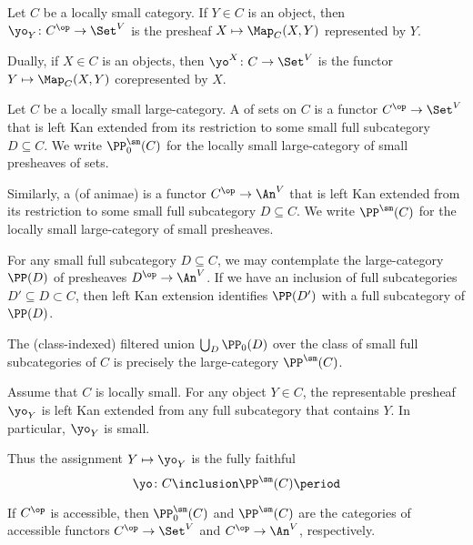 \begin{eg}
	Let $ C $ be a locally small category.
	If $ Y \in C $ is an object,
	then $ \yo_Y \colon C^{\op} \to \Set^V $ is
	the presheaf $ X \mapsto \Map_C(X,Y) $ represented by $ Y $.

	Dually, if $ X \in C $ is an objects,
	then $ \yo^X \colon C \to \Set^V $ is the functor
	$ Y \mapsto \Map_C(X,Y) $ corepresented by $ X $.
\end{eg}

\begin{definition}
	Let $ C $ be a locally small large-category.
	A  of sets on $ C $ is
	a functor $ C^{\op} \to \Set^V $
	that is left Kan extended from its restriction
	to some small full subcategory $ D \subseteq C $.
	We write $ \PP^{\sm}_0(C) $
	for the locally small large-category
	of small presheaves of sets.
	
	Similarly, a  (of animae) is
	a functor $ C^{\op} \to \An^V $
	that is left Kan extended from its restriction to
	some small full subcategory $ D \subseteq C $.
	We write $ \PP^{\sm}(C) $
	for the locally small large-category
	of small presheaves.
\end{definition}

\begin{nul}
	For any small full subcategory $ D \subseteq C $,
	we may contemplate the large-category $ \PP(D) $
	of presheaves $ D^{\op} \to \An^V $.
	If we have an inclusion of full subcategories
	$ D' \subseteq D \subset C $, then
	left Kan extension identifies $ \PP(D') $ with
	a full subcategory of $ \PP(D) $.
	
	The (class-indexed) filtered union
	$ \bigcup_D \PP_0(D) $
	over the class of small full subcategories of $ C $
	is precisely the large-category $ \PP^{\sm}(C) $.
\end{nul}

\begin{eg}
	Assume that $ C $ is locally small.
	For any object $ Y \in C $,
	the representable presheaf $ \yo_Y $ is left Kan extended
	from any full subcategory that contains $ Y $.
	In particular, $ \yo_Y $ is small.

	Thus the assignment $ Y \mapsto \yo_Y $ is
	the fully faithful 
	\[
		\yo \colon C \inclusion \PP^{\sm}(C) \period
	\]
\end{eg}

\begin{eg}
	If $ C^{\op} $ is accessible,
	then $ \PP^{\sm}_0(C) $ and $ \PP^{\sm}(C) $
	are the categories of accessible functors
	$ C^{\op} \to \Set^V $ and $ C^{\op} \to \An^V $, respectively.
\end{eg}

